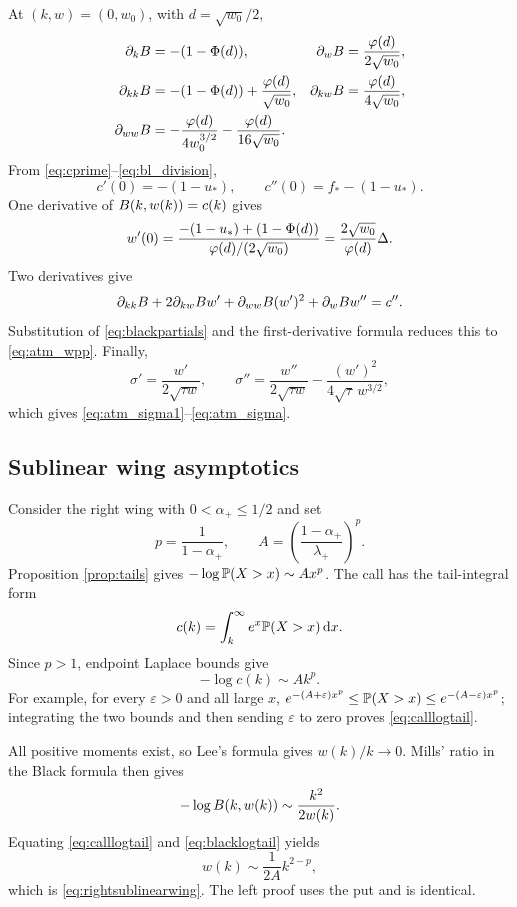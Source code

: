 At $(k,w)=(0,w_0)$, with $d=\sqrt{w_0}/2$,
\begin{equation}
\begin{aligned}
\partial_kB&=-(1-\Phi(d)),
&\partial_wB&=\frac{\varphi(d)}{2\sqrt{w_0}},\\
\partial_{kk}B&=-(1-\Phi(d))
+\frac{\varphi(d)}{\sqrt{w_0}},
&\partial_{kw}B&=\frac{\varphi(d)}{4\sqrt{w_0}},\\
\partial_{ww}B&=-\frac{\varphi(d)}{4w_0^{3/2}}
-\frac{\varphi(d)}{16\sqrt{w_0}}.
\end{aligned}
\label{eq:blackpartials}
\end{equation}
From \eqref{eq:cprime}--\eqref{eq:bl_division},
\[
c'(0)=-(1-u_*),\qquad c''(0)=f_*-(1-u_*).
\]
One derivative of $B(k,w(k))=c(k)$ gives
\[
w'(0)=
\frac{-(1-u_*)+(1-\Phi(d))}{\varphi(d)/(2\sqrt{w_0})}
=\frac{2\sqrt{w_0}}{\varphi(d)}\Delta.
\]
Two derivatives give
\[
\partial_{kk}B+2\partial_{kw}B w'
+\partial_{ww}B(w')^2+\partial_wB w''=c''.
\]
Substitution of \eqref{eq:blackpartials} and the first-derivative formula
reduces this to \eqref{eq:atm_wpp}.  Finally,
\[
\sigma'=\frac{w'}{2\sqrt{\tau w}},
\qquad
\sigma''=\frac{w''}{2\sqrt{\tau w}}
-\frac{(w')^2}{4\sqrt\tau\,w^{3/2}},
\]
which gives \eqref{eq:atm_sigma1}--\eqref{eq:atm_sigma}.

\subsection{Sublinear wing asymptotics}
\label{app:sublinearproof}

Consider the right wing with $0<\alpha_+\le1/2$ and set
\[
p=\frac1{1-\alpha_+},
\qquad
A=\left(\frac{1-\alpha_+}{\lambda_+}\right)^p.
\]
Proposition \ref{prop:tails} gives
$-\log\mathbb{P}(X>x)\sim Ax^p$.  The call has the tail-integral form
\[
c(k)=\int_k^\infty e^x\mathbb{P}(X>x)\,\mathrm{d} x.
\]
Since $p>1$, endpoint Laplace bounds give
\begin{equation}
-\log c(k)\sim Ak^p.
\label{eq:calllogtail}
\end{equation}
For example, for every $\varepsilon>0$ and all large $x$,
$e^{-(A+\varepsilon)x^p}\le\mathbb{P}(X>x)
\le e^{-(A-\varepsilon)x^p}$; integrating the two bounds and then sending
$\varepsilon$ to zero proves \eqref{eq:calllogtail}.

All positive moments exist, so Lee's formula gives $w(k)/k\to0$.  Mills'
ratio in the Black formula then gives
\begin{equation}
-\log B(k,w(k))
\sim\frac{k^2}{2w(k)}.
\label{eq:blacklogtail}
\end{equation}
Equating \eqref{eq:calllogtail} and \eqref{eq:blacklogtail} yields
\[
w(k)\sim\frac1{2A}k^{2-p},
\]
which is \eqref{eq:rightsublinearwing}.  The left proof uses the put and is
identical.

